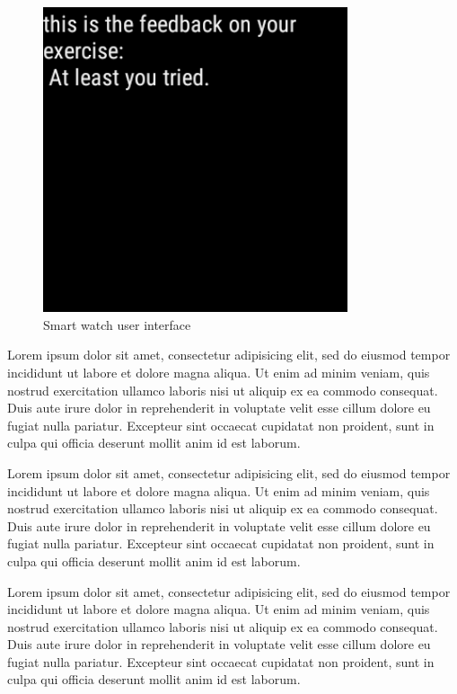 \begin{figure}[b!]
\begin{minipage}{0.20\textwidth}
    \end{minipage}
    \begin{minipage}{0.20\textwidth}
      \centering
        \includegraphics[width=0.80\textwidth]{00_resources/figures/Android_Watch_FeedbackView.png}
    \end{minipage}
  \caption{Smart watch user interface}
  \label{fig:smwui}
\end{figure}

Lorem ipsum dolor sit amet, consectetur adipisicing elit, sed do eiusmod tempor incididunt ut labore et dolore magna aliqua. Ut enim ad minim veniam, quis nostrud exercitation ullamco laboris nisi ut aliquip ex ea commodo consequat. Duis aute irure dolor in reprehenderit in voluptate velit esse cillum dolore eu fugiat nulla pariatur. Excepteur sint occaecat cupidatat non proident, sunt in culpa qui officia deserunt mollit anim id est laborum.

Lorem ipsum dolor sit amet, consectetur adipisicing elit, sed do eiusmod tempor incididunt ut labore et dolore magna aliqua. Ut enim ad minim veniam, quis nostrud exercitation ullamco laboris nisi ut aliquip ex ea commodo consequat. Duis aute irure dolor in reprehenderit in voluptate velit esse cillum dolore eu fugiat nulla pariatur. Excepteur sint occaecat cupidatat non proident, sunt in culpa qui officia deserunt mollit anim id est laborum.

Lorem ipsum dolor sit amet, consectetur adipisicing elit, sed do eiusmod tempor incididunt ut labore et dolore magna aliqua. Ut enim ad minim veniam, quis nostrud exercitation ullamco laboris nisi ut aliquip ex ea commodo consequat. Duis aute irure dolor in reprehenderit in voluptate velit esse cillum dolore eu fugiat nulla pariatur. Excepteur sint occaecat cupidatat non proident, sunt in culpa qui officia deserunt mollit anim id est laborum.
